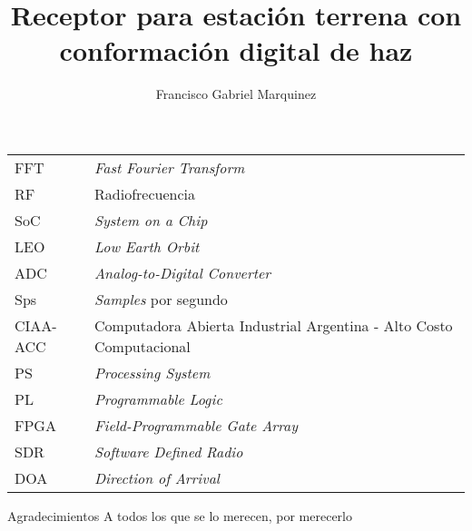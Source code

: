 \documentclass[screen, pagebackref,oneside]{ibtesis}
\title{Receptor para estación terrena con conformación digital de haz}
\author{Francisco Gabriel Marquinez}
\begin{document}
\begin{preliminary}


    \begin{abreviaturas}
        \begin{table}[H]
            \begin{tabular}{ll}
            FFT &   \textit{Fast Fourier Transform} \\
            RF  &   Radiofrecuencia                 \\
            SoC &   \textit{System on a Chip}       \\
            LEO &   \textit{Low Earth Orbit}        \\
            ADC &   \textit{Analog-to-Digital Converter} \\
            Sps &   \textit{Samples} por segundo   \\
            CIAA-ACC & Computadora Abierta Industrial Argentina - Alto Costo
            Computacional  \\
            PS  &   \textit{Processing System}  \\
            PL  &   \textit{Programmable Logic} \\
            FPGA &  \textit{Field-Programmable Gate Array} \\
            SDR &   \textit{Software Defined Radio} \\
            DOA &   \textit{Direction of Arrival}
            \end{tabular}
        \end{table}    
    \end{abreviaturas}
    
    \tableofcontents                %
    \listoffigures                  %
    \listoftables                   %
    
    
\end{preliminary}








\begin{biblio}
    
\end{biblio}

\begin{postliminary}

    \begin{seccion}{Agradecimientos}
    A todos los que se lo merecen, por merecerlo
    \end{seccion}
    
\end{postliminary}
    
\end{document}

